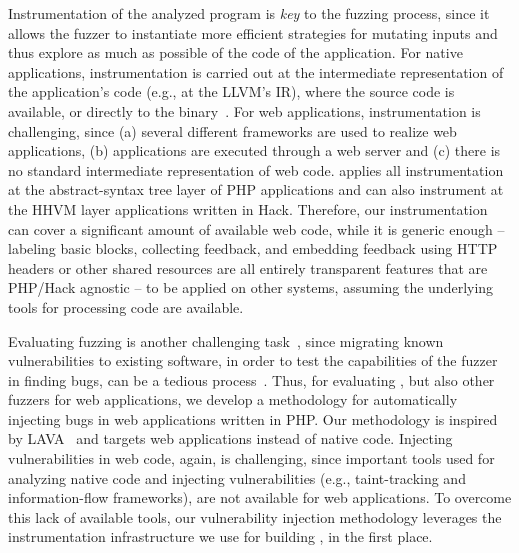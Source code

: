 Instrumentation of the analyzed program is \emph{key} to the fuzzing process,
since it allows the fuzzer to instantiate more efficient strategies for
mutating inputs and thus explore as much as possible of the code of the
application. For native applications, instrumentation is carried out at the
intermediate representation of the application's code (e.g., at the LLVM's IR),
where the source code is available, or directly to the
binary~\cite{zalewski2015american}. For web applications, instrumentation is
challenging, since (a) several different frameworks are used to realize web
applications, (b) applications are executed through a web server and (c) there
is no standard intermediate representation of web code. \pname{} applies all
instrumentation at the abstract-syntax tree layer of PHP applications and can
also instrument at the HHVM layer applications written in Hack\cite{hhvm}.
Therefore, our instrumentation can cover a significant amount of available web
code, while it is generic enough  -- labeling basic blocks, collecting
feedback, and embedding feedback using HTTP headers or other shared resources
are all entirely transparent features that are PHP/Hack agnostic -- to be applied on other
systems, assuming the underlying tools for processing code are available.

Evaluating fuzzing is another challenging task~\cite{klees2018Evaluation},
since migrating known vulnerabilities to existing software, in order to test
the capabilities of the fuzzer in finding bugs, can be a tedious
process~\cite{bug-reproduction}. Thus, for evaluating \pname{}, but also other
fuzzers for web applications, we develop a methodology for automatically
injecting bugs in web applications written in PHP.  Our methodology is inspired
by LAVA~\cite{dolan2016lava} and targets web applications instead of native
code. Injecting vulnerabilities in web code, again, is challenging, since
important tools used for analyzing native code and injecting vulnerabilities
(e.g., taint-tracking and information-flow frameworks), are not available for
web applications. To overcome this lack of available tools, our vulnerability
injection methodology leverages the instrumentation infrastructure we use for
building \pname{}, in the first place.






